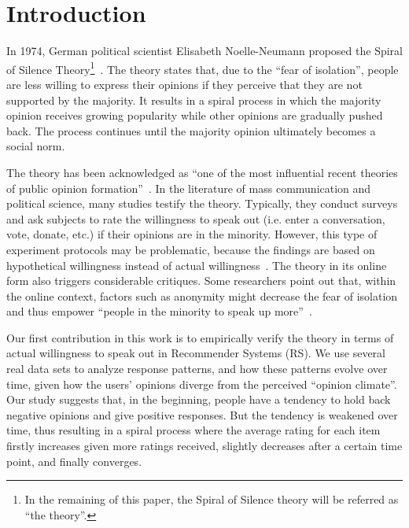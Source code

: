 \documentclass[sigconf]{acmart}
\begin{document}




\maketitle
\section{Introduction}\label{sec:introduction}

In 1974, German political scientist Elisabeth Noelle-Neumann proposed the Spiral of Silence Theory\footnote{In the remaining of this paper, the Spiral of Silence theory will be referred as ``the theory''.}~\cite{Neolle-Neumann1993spiral}. The theory states that, due to the ``fear of isolation'', people are less willing to express their opinions if they perceive that they are not supported by the majority. It results in a spiral process in which the majority opinion receives growing popularity while other opinions are gradually pushed back. The process continues until the majority opinion ultimately becomes a social norm.

The theory has been acknowledged as ``one of the most influential recent theories of public opinion formation''~\cite{Kennamer1990Self}. In the literature of mass communication and political science, many studies testify the theory. Typically, they conduct surveys and ask subjects to rate the willingness to speak out (i.e. enter a conversation, vote, donate, etc.) if their opinions are in the minority. However, this type of experiment protocols may be problematic, because the findings are based on hypothetical willingness instead of actual willingness~\cite{Carroll1997Perceived}. The theory in its online form also triggers considerable critiques. Some researchers point out that, within the online context, factors such as anonymity might decrease the fear of isolation and thus empower ``people in the minority to speak up more''~\cite{mcdevitt2003spiral}.

Our first contribution in this work is to empirically verify the theory in terms of actual willingness to speak out in Recommender Systems (RS). We use several real data sets to analyze response patterns, and how these patterns evolve over time, given how the users' opinions diverge from the perceived ``opinion climate''. Our study suggests that, in the beginning, people have a tendency to hold back negative opinions and give positive responses. But the tendency is weakened over time, thus resulting in a spiral process where the average rating for each item firstly increases given more ratings received, slightly decreases after a certain time point, and finally converges.
\end{document}
